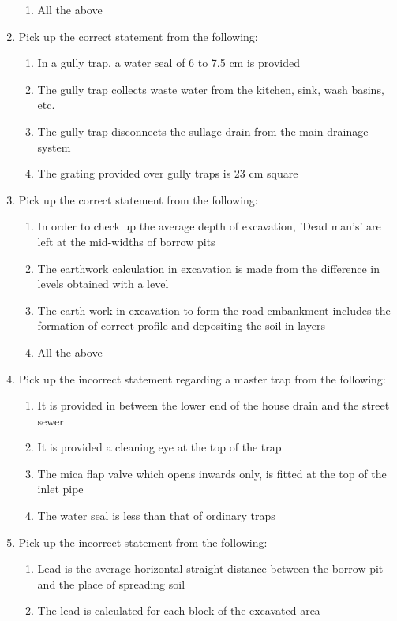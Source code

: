 \documentclass[11pt,a4paper]{article}
\begin{document}
\begin{enumerate}
\begin{enumerate}[label=\Alph*.]
\item{All the above}
\end{enumerate}
\item{Pick up the correct statement from the following:}
\begin{enumerate}[label=\Alph*.]
\item{In a gully trap, a water seal of 6 to 7.5 cm is provided}
\item{The gully trap collects waste water from the kitchen, sink, wash basins, etc.}
\item{The gully trap disconnects the sullage drain from the main drainage system}
\item{The grating provided over gully traps is 23 cm square}
\end{enumerate}
\item{Pick up the correct statement from the following:}
\begin{enumerate}[label=\Alph*.]
\item{In order to check up the average depth of excavation, 'Dead man's' are left at the mid-widths of borrow pits}
\item{The earthwork calculation in excavation is made from the difference in levels obtained with a level}
\item{The earth work in excavation to form the road embankment includes the formation of correct profile and depositing the soil in layers}
\item{All the above}
\end{enumerate}
\item{Pick up the incorrect statement regarding a master trap from the following:}
\begin{enumerate}[label=\Alph*.]
\item{It is provided in between the lower end of the house drain and the street sewer}
\item{It is provided a cleaning eye at the top of the trap}
\item{The mica flap valve which opens inwards only, is fitted at the top of the inlet pipe}
\item{The water seal is less than that of ordinary traps}
\end{enumerate}
\item{Pick up the incorrect statement from the following:}
\begin{enumerate}[label=\Alph*.]
\item{Lead is the average horizontal straight distance between the borrow pit and the place of spreading soil}
\item{The lead is calculated for each block of the excavated area}

\end{enumerate}
\end{enumerate}
\end{document}
